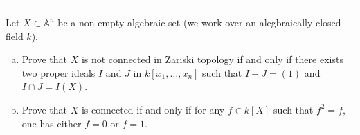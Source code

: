 \documentclass[letterpaper, 12pt]{article}
\begin{document}
\noindent\rule{7in}{2.8pt}
\begin{problem}{7}
Let \(X\subset \mathbb{A}^n\) be a non-empty algebraic set (we work over an alegbraically closed field \(k\)).
\begin{enumerate}[(a)]
\item Prove that \(X\) is not connected in Zariski topology if and only if there exists two proper ideals \(I\) and \(J\) in \(k[x_1,\ldots,x_n]\) such that \(I+J=(1)\) and \(I\cap J=I(X)\). 
\item Prove that \(X\) is connected if and only if for any \(f\in k[X]\) such that \(f^2=f\), one has either \(f=0\) or \(f=1\).
\end{enumerate}
\end{problem}
\end{document}
